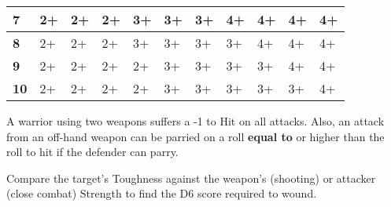 \begin{nscenter}
{\begin{tabular}{|l|llllllllll|}
\textbf{7} &
\multicolumn{1}{l|}{2+} &
\multicolumn{1}{l|}{2+} &
\multicolumn{1}{l|}{2+} &
\multicolumn{1}{l|}{3+} &
\multicolumn{1}{l|}{3+} &
\multicolumn{1}{l|}{3+} &
\multicolumn{1}{l|}{4+} &
\multicolumn{1}{l|}{4+} &
\multicolumn{1}{l|}{4+} &
4+ \\ \hline
\textbf{8} &
\multicolumn{1}{l|}{2+} &
\multicolumn{1}{l|}{2+} &
\multicolumn{1}{l|}{2+} &
\multicolumn{1}{l|}{3+} &
\multicolumn{1}{l|}{3+} &
\multicolumn{1}{l|}{3+} &
\multicolumn{1}{l|}{3+} &
\multicolumn{1}{l|}{4+} &
\multicolumn{1}{l|}{4+} &
4+ \\ \hline
\textbf{9} &
\multicolumn{1}{l|}{2+} &
\multicolumn{1}{l|}{2+} &
\multicolumn{1}{l|}{2+} &
\multicolumn{1}{l|}{2+} &
\multicolumn{1}{l|}{3+} &
\multicolumn{1}{l|}{3+} &
\multicolumn{1}{l|}{3+} &
\multicolumn{1}{l|}{3+} &
\multicolumn{1}{l|}{4+} &
4+ \\ \hline
\textbf{10} &
\multicolumn{1}{l|}{2+} &
\multicolumn{1}{l|}{2+} &
\multicolumn{1}{l|}{2+} &
\multicolumn{1}{l|}{2+} &
\multicolumn{1}{l|}{3+} &
\multicolumn{1}{l|}{3+} &
\multicolumn{1}{l|}{3+} &
\multicolumn{1}{l|}{3+} &
\multicolumn{1}{l|}{3+} &
4+ \\ \hline
\end{tabular}
}
\end{nscenter}

A warrior using two weapons suffers a -1 to Hit on all attacks. Also, an attack from an off-hand weapon can be parried on a roll \textbf{equal to} or higher than the roll to hit if the defender can parry. 

Compare the target's Toughness against the weapon's (shooting) or attacker (close combat)
Strength to find the D6 score required to wound.

